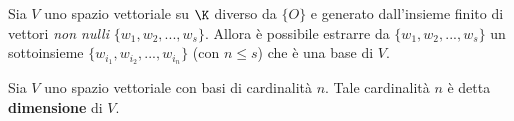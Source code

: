 \begin{theorem}
	Sia $V$ uno spazio vettoriale su $\K$ diverso da $\{O\}$ e generato
	dall'insieme finito di vettori \emph{non nulli} $\{w_1, w_2, ..., w_s\}$.
	Allora è possibile estrarre da $\{w_1, w_2, ..., w_s\}$ un sottoinsieme
	$\{w_{i_1}, w_{i_2}, ..., w_{i_n}\}$ (con $n \leq s$) che è una base di $V$.
\end{theorem}

\begin{definition}
	Sia $V$  uno spazio vettoriale con basi di cardinalità $n$. Tale cardinalità
	$n$ è detta \textbf{dimensione} di $V$.
\end{definition}

